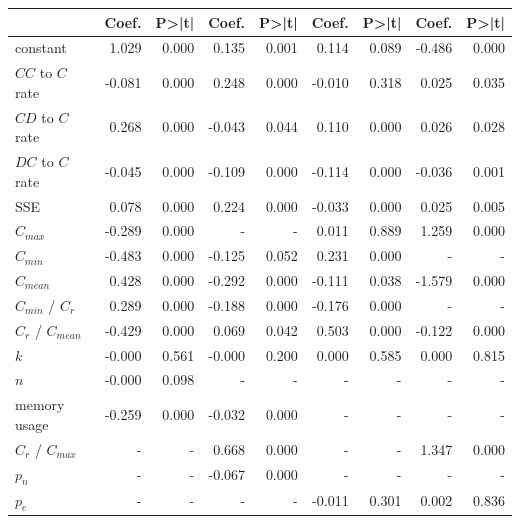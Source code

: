\begin{tabular}{lrrrrrrrr}
\toprule
{} &  Coef. &  P>|t| &  Coef. &  P>|t| &  Coef. &  P>|t| &  Coef. &  P>|t| \\
\midrule
constant           &  1.029 &  0.000 &  0.135 &  0.001 &  0.114 &  0.089 & -0.486 &  0.000 \\
$CC$ to $C$ rate   & -0.081 &  0.000 &  0.248 &  0.000 & -0.010 &  0.318 &  0.025 &  0.035 \\
$CD$ to $C$ rate   &  0.268 &  0.000 & -0.043 &  0.044 &  0.110 &  0.000 &  0.026 &  0.028 \\
$DC$ to $C$ rate   & -0.045 &  0.000 & -0.109 &  0.000 & -0.114 &  0.000 & -0.036 &  0.001 \\
SSE                &  0.078 &  0.000 &  0.224 &  0.000 & -0.033 &  0.000 &  0.025 &  0.005 \\
$C_{max}$          & -0.289 &  0.000 &      - &      - &  0.011 &  0.889 &  1.259 &  0.000 \\
$C_{min}$          & -0.483 &  0.000 & -0.125 &  0.052 &  0.231 &  0.000 &      - &      - \\
$C_{mean}$         &  0.428 &  0.000 & -0.292 &  0.000 & -0.111 &  0.038 & -1.579 &  0.000 \\
$C_{min}$ / $C_r$  &  0.289 &  0.000 & -0.188 &  0.000 & -0.176 &  0.000 &      - &      - \\
$C_r$ / $C_{mean}$ & -0.429 &  0.000 &  0.069 &  0.042 &  0.503 &  0.000 & -0.122 &  0.000 \\
$k$                & -0.000 &  0.561 & -0.000 &  0.200 &  0.000 &  0.585 &  0.000 &  0.815 \\
$n$                & -0.000 &  0.098 &      - &      - &      - &      - &      - &      - \\
memory usage       & -0.259 &  0.000 & -0.032 &  0.000 &      - &      - &      - &      - \\
$C_r$ / $C_{max}$  &      - &      - &  0.668 &  0.000 &      - &      - &  1.347 &  0.000 \\
$p_n$              &      - &      - & -0.067 &  0.000 &      - &      - &      - &      - \\
$p_e$              &      - &      - &      - &      - & -0.011 &  0.301 &  0.002 &  0.836 \\
\bottomrule
\end{tabular}
